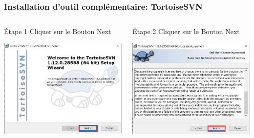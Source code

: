 \documentclass{beamer}
\begin{document}
\begin{frame}
\frametitle{Installation d'outil complémentaire: TortoiseSVN}
  \begin{columns}[T]
    \begin{column}{.4\textwidth}
     \begin{block}{Étape 1}
Cliquer sur le Bouton \alert{Next}
    \end{block}
     \includegraphics[width=\textwidth]{../images/intalstp1.jpg}
    \end{column}
    \begin{column}{.4\textwidth}
     \begin{block}{Étape 2}
Cliquer sur le Bouton \alert{Next}
    \end{block}
     \includegraphics[width=\textwidth]{../images/intalstp2.jpg}
    \end{column}
  \end{columns}
\end{frame}
\end{document}
